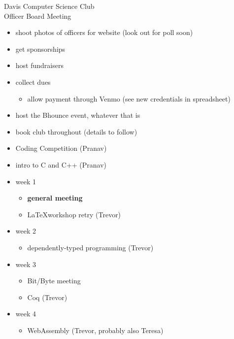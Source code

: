 \documentclass{article}
\begin{document}
\begin{Minutes}{Davis Computer Science Club\\Officer Board Meeting}
\begin{itemize}
\item shoot photos of officers for website (look out for poll soon)
\item get sponsorships
\item host fundraisers
\item collect dues
  \begin{itemize}
  \item allow payment through Venmo (see new credentials in spreadsheet)
  \end{itemize}
\item host the Bhounce event, whatever that is
\item book club throughout (details to follow)
\item Coding Competition (Pranav)
\item intro to C and C++ (Pranav)
\item week 1
  \begin{itemize}
  \item \textbf{general meeting}
  \item \LaTeX workshop retry (Trevor)
  \end{itemize}
\item week 2
  \begin{itemize}
  \item dependently-typed programming (Trevor)
  \end{itemize}
\item week 3
  \begin{itemize}
  \item Bit/Byte meeting
  \item Coq (Trevor)
  \end{itemize}
\item week 4
  \begin{itemize}
  \item WebAssembly (Trevor, probably also Teresa)
  \end{itemize}
\end{itemize}
\thispagestyle{creditfooter}
\end{Minutes}
\end{document}
